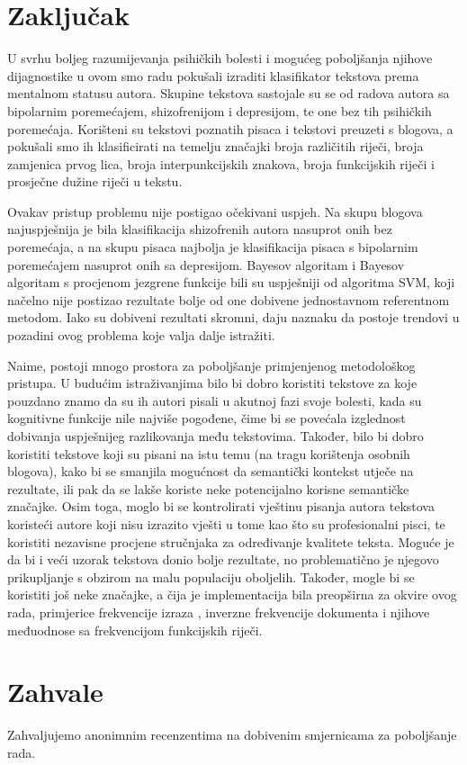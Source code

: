 \documentclass[10pt, a4paper]{article}
\begin{document}
\section{Zaključak}

U svrhu boljeg razumijevanja psihičkih bolesti i mogućeg poboljšanja njihove dijagnostike u ovom smo radu pokušali izraditi klasifikator tekstova prema mentalnom statusu autora. Skupine tekstova sastojale su se od radova autora sa bipolarnim poremećajem, shizofrenijom i depresijom, te one bez tih psihičkih poremećaja. Korišteni su tekstovi poznatih pisaca i tekstovi preuzeti s blogova, a pokušali smo ih klasificirati na temelju značajki broja različitih riječi, broja zamjenica prvog lica, broja interpunkcijskih znakova, broja funkcijskih riječi i prosječne dužine riječi u tekstu. 

Ovakav pristup problemu nije postigao očekivani uspjeh. Na skupu blogova najuspješnija je bila klasifikacija shizofrenih autora nasuprot onih bez poremećaja, a na skupu pisaca najbolja je klasifikacija pisaca s bipolarnim poremećajem nasuprot onih sa depresijom. Bayesov algoritam i Bayesov algoritam s procjenom jezgrene funkcije bili su uspješniji od algoritma SVM, koji načelno nije postizao rezultate bolje od one dobivene jednostavnom referentnom metodom. Iako su dobiveni rezultati skromni, daju naznaku da postoje trendovi u pozadini ovog problema koje valja dalje istražiti. 

Naime, postoji mnogo prostora za poboljšanje primjenjenog metodološkog pristupa. U budućim istraživanjima bilo bi dobro koristiti tekstove za koje pouzdano znamo da su ih autori pisali u akutnoj fazi svoje bolesti, kada su kognitivne funkcije nile najviše pogođene, čime bi se povećala izglednost dobivanja uspješnijeg razlikovanja među tekstovima. Također, bilo bi dobro koristiti tekstove koji su pisani na istu temu (na tragu korištenja osobnih blogova), kako bi se smanjila mogućnost da semantički kontekst utječe na rezultate, ili pak da se lakše koriste neke potencijalno korisne semantičke značajke. Osim toga, moglo bi se kontrolirati vještinu pisanja autora tekstova koristeći autore koji nisu izrazito vješti u tome kao što su profesionalni pisci, te koristiti nezavisne procjene stručnjaka za određivanje kvalitete teksta. Moguće je da bi i veći uzorak tekstova donio bolje rezultate, no problematično je njegovo prikupljanje s obzirom na malu populaciju oboljelih. Također, mogle bi se koristiti još neke značajke, a čija je implementacija bila preopširna za okvire ovog rada, primjerice frekvencije izraza , inverzne frekvencije dokumenta  i njihove međuodnose sa frekvencijom funkcijskih riječi.

\section*{Zahvale}
Zahvaljujemo anonimnim recenzentima na dobivenim smjernicama za poboljšanje rada.


 
\end{document}
